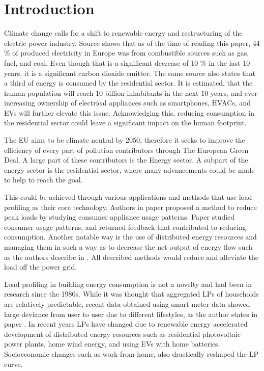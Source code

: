 \chapter{Introduction}
\label{chapter1}

Climate change calls for a shift to renewable energy and restructuring of the electric power industry.
Source \cite{eurostat2020} shows that as of the time of reading this paper, 44 \% of produced electricity in Europe was from combustible sources such as gas, fuel, and coal. Even 
though that is a significant decrease of 10 \% in the last 10 years, it is a significant carbon dioxide emitter.
The same source \cite{eurostat2020} also states that a third of energy is consumed by the residential sector. It is estimated, 
that the human population will reach 10 billion inhabitants in the next 10 years, and ever-increasing ownership of electrical appliances such as smartphones, HVACs, and EVs will further elevate this issue.
Acknowledging this, reducing consumption in the residential sector could leave a significant impact on the human footprint. 


The EU aims to be climate neutral by 2050, therefore it seeks to improve the efficiency of every part of pollution contributors through The European Green Deal.
A large part of these contributors is the Energy sector.
A subpart of the energy sector is the residential sector, where many advancements could be made to help to reach the goal.  

This could be achieved through various applications and methods that use load profiling as their core technology.
Authors in paper \cite{Chuan2014} proposed a method to reduce peak loads by studying consumer
appliance usage patterns. Paper \cite{Csoknyai2019} studied consumer usage patterns, and returned feedback that contributed to reducing consumption.
Another notable way is the use of distributed energy resources and managing them in such a way as to decrease the net output of energy flow such as the authors describe in
\cite{MORENOJARAMILLO2021445}. All described methods would reduce and alleviate the load off the power grid.

Load profiling in building energy consumption is not a novelty and had been in research since the 1980s.
While it was thought that aggregated LPs of households are relatively predictable, recent data obtained using smart meter data showed large deviance from user to user due to different lifestyles, as the author states in paper \cite{Review2021}.
In recent years LPs have changed due to renewable energy accelerated development of distributed energy resources such as residential photovoltaic
power plants, home wind energy, and using EVs with home batteries. Socioeconomic changes such as work-from-home, also drastically reshaped the LP curve. 

